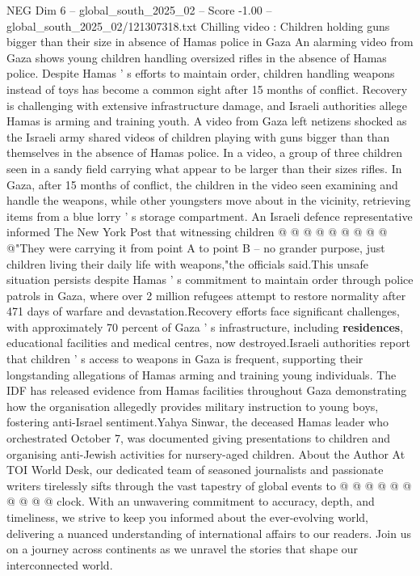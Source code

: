 \begin{textsample}{NEG Dim 6 – global\_south\_2025\_02 – Score -1.00 – global\_south\_2025\_02/121307318.txt}  \label{ex:f6_neg_048}
Chilling video : Children holding guns bigger than their size in absence of Hamas police in Gaza An alarming video from Gaza shows young children handling oversized rifles in the absence of Hamas police.
Despite Hamas ' s efforts to maintain order, children handling weapons instead of toys has become a common sight after 15 months of conflict.
Recovery is challenging with extensive infrastructure damage, and Israeli authorities allege Hamas is arming and training youth.
A video from Gaza left netizens shocked as the Israeli army shared videos of children playing with guns bigger than than themselves in the absence of Hamas police.
In a video, a group of three children seen in a sandy field carrying what appear to be larger than their sizes rifles.
In Gaza, after 15 months of conflict, the children in the video seen examining and handle the weapons, while other youngsters move about in the vicinity, retrieving items from a blue lorry ' s storage compartment.
An Israeli defence representative informed The New York Post that witnessing children @ @ @ @ @ @ @ @ @ @"They were carrying it from point A to point B -- no grander purpose, just children living their daily life with weapons,"the officials said.This unsafe situation persists despite Hamas ' s commitment to maintain order through police patrols in Gaza, where over 2 million refugees attempt to restore normality after 471 days of warfare and devastation.Recovery efforts face significant challenges, with approximately 70 percent of Gaza ' s infrastructure, including \textbf{residences}, educational facilities and medical centres, now destroyed.Israeli authorities report that children ' s access to weapons in Gaza is frequent, supporting their longstanding allegations of Hamas arming and training young individuals.
The IDF has released evidence from Hamas facilities throughout Gaza demonstrating how the organisation allegedly provides military instruction to young boys, fostering anti-Israel sentiment.Yahya Sinwar, the deceased Hamas leader who orchestrated October 7, was documented giving presentations to children and organising anti-Jewish activities for nursery-aged children.
About the Author At TOI World Desk, our dedicated team of seasoned journalists and passionate writers tirelessly sifts through the vast tapestry of global events to @ @ @ @ @ @ @ @ @ @ clock.
With an unwavering commitment to accuracy, depth, and timeliness, we strive to keep you informed about the ever-evolving world, delivering a nuanced understanding of international affairs to our readers.
Join us on a journey across continents as we unravel the stories that shape our interconnected world.

\end{textsample}
